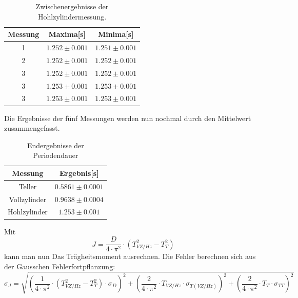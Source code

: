\documentclass[12pt,a4paper]{article}
\begin{document}
\begin{table}
\caption{Zwischenergebnisse der Hohlzylindermessung.}
\begin{center}
\begin{tabular}{|c|c|c|}
\hline
Messung &  Maxima[s] &  Minima[s]  \\
\hline
1 &  $1.252 \pm 0.001$  &  $1.251 \pm  0.001$ \\
\hline
2 &  $1.252 \pm 0.001$  &  $1.252 \pm  0.001$ \\
\hline
3 &  $1.252 \pm  0.001$  &  $1.252 \pm  0.001$ \\
\hline
3 &  $1.253 \pm  0.001$  &  $1.253 \pm  0.001$ \\
\hline
3 &  $1.253 \pm  0.001$  &  $1.253 \pm  0.001$ \\
\hline
\end{tabular}
\end{center}
\label{tab:Hohl_Ergebnisse}
\end{table}

Die Ergebnisse der fünf Messungen werden nun nochmal durch den Mittelwert zusammengefasst.

\begin{table}
\caption{Endergebnisse der Periodendauer}
\begin{center}
\begin{tabular}{|c|c|}
\hline
Messung &  Ergebnis[s]  \\
\hline
Teller &  $0.5861 \pm 0.0001$ \\
\hline
Vollzylinder &  $0.9638 \pm 0.0004$ \\
\hline
Hohlzylinder &  $1.253 \pm  0.001$ \\
\hline
\end{tabular}
\end{center}
\label{tab:Zylinder_Mittel}
\end{table}
Mit
\begin{equation}
J = \dfrac{D}{4\cdot \pi^{2}}\cdot (T_{VZ/Hz}^{2}-T_T^2)
\end{equation}
kann man nun Das Trägheitsmoment ausrechnen. Die Fehler berechnen sich aus der Gausschen Fehlerfortpflanzung:
\begin{equation}
\sigma_J = \sqrt{(\dfrac{1}{4\cdot \pi^{2}}\cdot (T_{VZ/Hz}^{2}-T_T^2)\cdot \sigma_D )^2+ (\dfrac{2}{4\cdot \pi^{2}}\cdot T_{VZ/Hz}\cdot \sigma_{T(VZ/Hz)})^2+ (\dfrac{2}{4\cdot \pi^{2}}\cdot T_{T}\cdot \sigma_{TT} )^2}
\end{equation}
\end{document}
